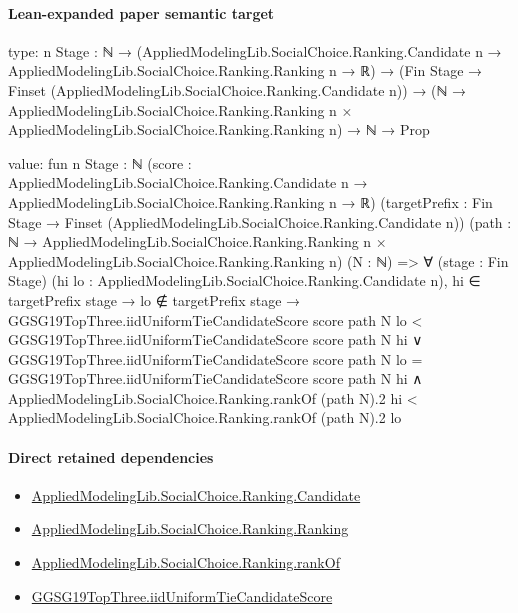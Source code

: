 \documentclass[10pt]{article}
\begin{document}
\paragraph{Lean-expanded paper semantic target}
\begin{ReviewVerbatim}
type:
{n Stage : ℕ} →
  (AppliedModelingLib.SocialChoice.Ranking.Candidate n → AppliedModelingLib.SocialChoice.Ranking.Ranking n → ℝ) →
    (Fin Stage → Finset (AppliedModelingLib.SocialChoice.Ranking.Candidate n)) →
      (ℕ → AppliedModelingLib.SocialChoice.Ranking.Ranking n × AppliedModelingLib.SocialChoice.Ranking.Ranking n) →
        ℕ → Prop

value:
fun {n Stage : ℕ}
    (score :
      AppliedModelingLib.SocialChoice.Ranking.Candidate n → AppliedModelingLib.SocialChoice.Ranking.Ranking n → ℝ)
    (targetPrefix : Fin Stage → Finset (AppliedModelingLib.SocialChoice.Ranking.Candidate n))
    (path : ℕ → AppliedModelingLib.SocialChoice.Ranking.Ranking n × AppliedModelingLib.SocialChoice.Ranking.Ranking n)
    (N : ℕ) =>
  ∀ (stage : Fin Stage) (hi lo : AppliedModelingLib.SocialChoice.Ranking.Candidate n),
    hi ∈ targetPrefix stage →
      lo ∉ targetPrefix stage →
        GGSG19TopThree.iidUniformTieCandidateScore score path N lo <
            GGSG19TopThree.iidUniformTieCandidateScore score path N hi ∨
          GGSG19TopThree.iidUniformTieCandidateScore score path N lo =
              GGSG19TopThree.iidUniformTieCandidateScore score path N hi ∧
            AppliedModelingLib.SocialChoice.Ranking.rankOf (path N).2 hi <
              AppliedModelingLib.SocialChoice.Ranking.rankOf (path N).2 lo
\end{ReviewVerbatim}

\paragraph{Direct retained dependencies}
\begin{itemize}\raggedright
\item \hyperlink{governing-declaration-8c0e6c25845ae78a}{Applied\allowbreak{}Modeling\allowbreak{}Lib.\allowbreak{}Social\allowbreak{}Choice.\allowbreak{}Ranking.\allowbreak{}Candidate}
\item \hyperlink{governing-declaration-5cde54446d1ae021}{Applied\allowbreak{}Modeling\allowbreak{}Lib.\allowbreak{}Social\allowbreak{}Choice.\allowbreak{}Ranking.\allowbreak{}Ranking}
\item \hyperlink{governing-declaration-ef804e95c0f14f7c}{Applied\allowbreak{}Modeling\allowbreak{}Lib.\allowbreak{}Social\allowbreak{}Choice.\allowbreak{}Ranking.\allowbreak{}rank\allowbreak{}Of}
\item \hyperlink{governing-declaration-cc3901ae45d4b9d2}{GGSG19\allowbreak{}Top\allowbreak{}Three.\allowbreak{}iid\allowbreak{}Uniform\allowbreak{}Tie\allowbreak{}Candidate\allowbreak{}Score}
\end{itemize}
\end{document}
